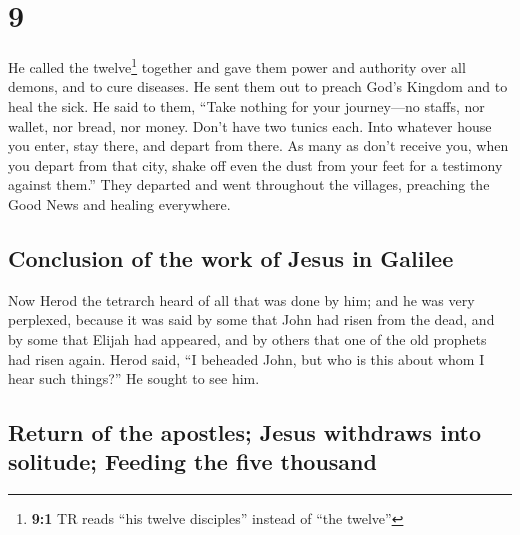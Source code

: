\hypertarget{section-8}{%
\section{9}\label{section-8}}

 He called the twelve\footnote{\textbf{9:1} TR reads ``his
  twelve disciples'' instead of ``the twelve''} together and gave them
power and authority over all demons, and to cure diseases.
 He sent them out to preach God's Kingdom and to heal the
sick.  He said to them, ``Take nothing for your
journey---no staffs, nor wallet, nor bread, nor money. Don't have two
tunics each.  Into whatever house you enter, stay there,
and depart from there.  As many as don't receive you, when
you depart from that city, shake off even the dust from your feet for a
testimony against them.''  They departed and went
throughout the villages, preaching the Good News and healing everywhere.

\hypertarget{conclusion-of-the-work-of-jesus-in-galilee}{%
\subsection{Conclusion of the work of Jesus in
Galilee}\label{conclusion-of-the-work-of-jesus-in-galilee}}

 Now Herod the tetrarch heard of all that was done by him;
and he was very perplexed, because it was said by some that John had
risen from the dead,  and by some that Elijah had
appeared, and by others that one of the old prophets had risen again.
 Herod said, ``I beheaded John, but who is this about whom
I hear such things?'' He sought to see him.

\hypertarget{return-of-the-apostles-jesus-withdraws-into-solitude-feeding-the-five-thousand}{%
\subsection{Return of the apostles; Jesus withdraws into solitude;
Feeding the five
thousand}\label{return-of-the-apostles-jesus-withdraws-into-solitude-feeding-the-five-thousand}}

